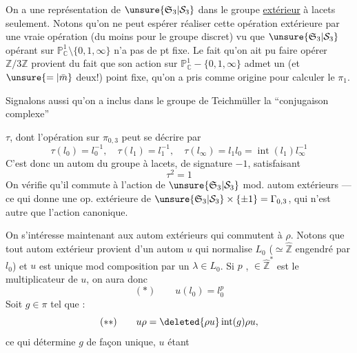 On a une représentation de $\unsure{\mathfrak S_3|\mathcal S_3}$ dans le groupe \uline{extérieur} à lacets seulement. Notons qu'on ne peut espérer réaliser cette opération extérieure par une vraie opération (du moins pour le groupe discret) vu que $\unsure{\mathfrak S_3|\mathcal S_3}$ opérant sur $\mathbb P^1_{\mathbb C}\setminus\{0,1,\infty\}$ n'a pas de pt fixe. Le fait qu'on ait pu faire opérer $\mathbb Z/3\mathbb Z$  provient du fait que son action sur $\mathbb P^1_{\mathbb C}-\{0,1,\infty\}$ admet un (et $\unsure{=|\bar m}$ deux!) point fixe,  qu'on  a pris comme origine pour calculer le $\pi_1$.

Signalons aussi qu'on a inclus dans le groupe de Teichmüller  la ``conjugaison complexe''

$\tau$, dont l'opération sur $\pi_{0,3}$ peut se décrire par
\[
\tau(l_0)=l_0^{-1},\quad\tau(l_1)=l_1^{-1},\quad\tau(l_\infty)=l_1l_0=\operatorname{int}(l_1)l_\infty^{-1}
\]
C'est donc un autom du groupe à lacets, de signature $-1$, satisfaisant
\[
\tau^2=1
\]
On vérifie qu'il commute à l'action de $\unsure{\mathfrak S_3|\mathcal S_3}$ mod. autom extérieurs --- ce qui donne une op. extérieure de $\unsure{\mathfrak S_3|\mathcal S_3}\times\{\pm1\}=\Gamma_{0,3}$, qui n'est autre que l'action canonique.

On s'intéresse maintenant aux autom extérieurs qui commutent à $\rho$. Notons que tout autom extérieur  provient d'un autom $u$ qui normalise  $L_0$ ($\simeq\hat{\mathbb Z}$ engendré par $l_0$) et $u$ est unique mod composition par un $\lambda\in L_0$. Si $p$ , $\in\hat{\mathbb Z}^{*}$  est le multiplicateur de $u$, on aura donc
\[
(*)\qquad u(l_0)=l_0^p
\]
Soit $g\in\pi$ tel que :
\[
(**)\qquad u\rho=\deleted{\rho u}\operatorname{int}(g)\rho u,
\]
ce qui détermine $g$ de façon unique, $u$ étant

